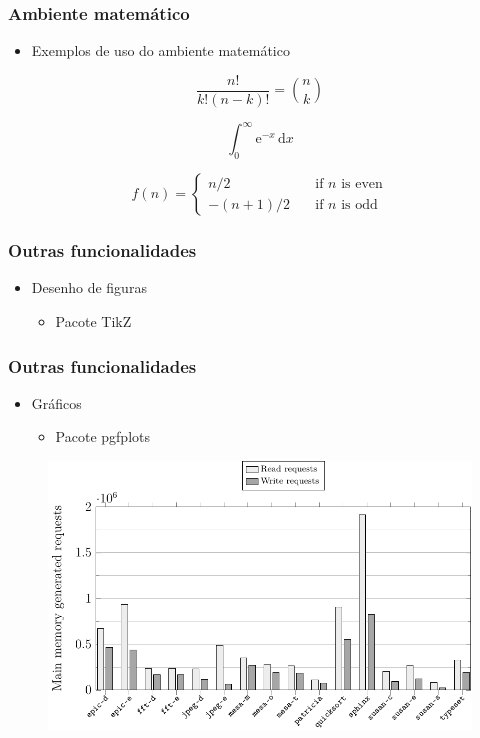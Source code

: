 \begin{frame}[fragile] \frametitle{Ambiente matemático}
\begin{itemize}
	\item Exemplos de uso do ambiente matemático
\end{itemize}

$$ \frac{n!}{k!(n-k)!} = \binom{n}{k} $$

$$ \int_0^\infty \mathrm{e}^{-x}\,\mathrm{d}x $$

\[ f(n) =
  \begin{cases}
    n/2       & \quad \text{if } n \text{ is even}\\
    -(n+1)/2  & \quad \text{if } n \text{ is odd}
  \end{cases}
\]

\end{frame}

\begin{frame}[fragile] \frametitle{Outras funcionalidades}
\begin{itemize}
	\item Desenho de figuras
	\begin{itemize}
		\item Pacote TikZ
	\end{itemize}
\end{itemize}

\begin{figure}[!h]

\end{figure}
\end{frame}

\begin{frame}[fragile] \frametitle{Outras funcionalidades}
\begin{itemize}
	\item Gráficos
	\begin{itemize}
		\item Pacote pgfplots
	\end{itemize}
\end{itemize}

\begin{figure}[!h]
\centering
\includegraphics[scale=0.75]{pdfimages/requests-more-50k}
\end{figure}
\end{frame}


